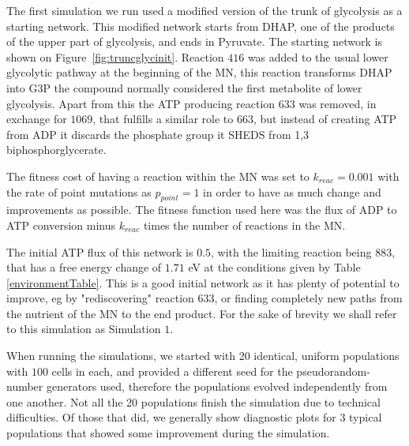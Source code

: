 \documentclass[a4paper,12pt]{article}
\begin{document}
The first simulation we run used a modified version of the trunk of glycolysis as a starting network. This modified network starts from DHAP, one of the products of the upper part of glycolysis,  and ends in Pyruvate. The starting network is shown on Figure~\ref{fig:truncglycinit}.  Reaction $416$ was added to the usual lower glycolytic pathway at the beginning of the MN, this reaction transforms DHAP into G3P the compound normally considered the first metabolite of lower glycolysis.  Apart from this the ATP producing reaction $633$ was removed, in exchange for $1069$, that fulfills a similar role to $663$, but instead of creating ATP from ADP it discards the phosphate group it SHEDS from 1,3 biphosphorglycerate.

The fitness cost of having a reaction within the MN was set to $k_{reac}=0.001$ with the rate of point mutations as $p_{point}=1$ in order to have as much change and improvements as possible. The fitness function used here was the flux of ADP to ATP conversion minus $k_{reac}$ times the number of reactions in the MN.

The initial ATP flux of this network is $0.5$, with the limiting reaction being $883$, that has a free energy change of $1.71$ eV at the conditions given by Table \ref{environmentTable}. This is a good initial network as it has plenty of potential to improve, eg by "rediscovering" reaction $633$, or finding completely new paths from the nutrient of the MN to the end product. For the sake of brevity we shall refer to this simulation as Simulation $1$.

When running the simulations, we started with 20 identical, uniform populations with $100$ cells in each, and provided a different seed for the pseudorandom-number generators used, therefore the populations evolved independently from one another. Not all the 20 populations finish the simulation due to technical difficulties. Of those that did, we generally show diagnostic plots for 3 typical populations that showed some improvement during the simulation.
\end{document}
